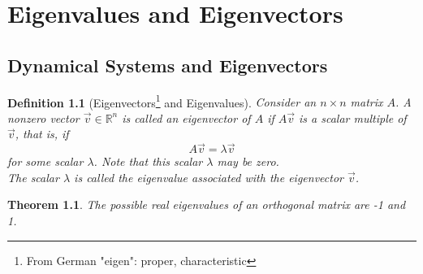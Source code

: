 \documentclass[10pt]{report}
\newtheorem{thm2}{Theorem}[section]
\newtheorem{def2}{Definition}[section]
\begin{document}
\chapter{Eigenvalues and Eigenvectors}
\section{Dynamical Systems and Eigenvectors}
\begin{def2}[Eigenvectors\footnote{From German "eigen": proper, characteristic} and Eigenvalues]
Consider an $n\times n$ matrix $A$. A nonzero vector $\vec{v}\in \mathbb{R}^n$ is called an eigenvector of $A$ if $A\vec{v}$ is a scalar multiple of $\vec{v}$, that is, if
$$A\vec{v}=\lambda\vec{v}$$
for some scalar $\lambda$. Note that this scalar $\lambda$ may be zero.\\
The scalar $\lambda$ is called the eigenvalue associated with the eigenvector $\vec{v}$.
\end{def2}
\begin{thm2}
The possible real eigenvalues of an orthogonal matrix are -1 and 1.
\end{thm2}
\end{document}
